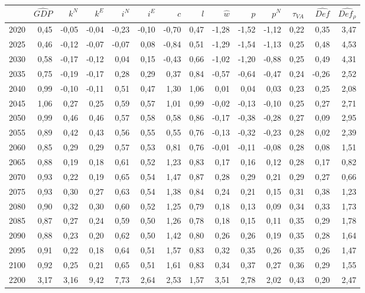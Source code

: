 \begin{tabular}{lrrrrrrrrrrrrr}
\toprule
 & $\hat{GDP}$ & $k^N$ & $k^E$ & $i^N$ & $i^E$ & $c$ & $l$ & $\hat{w}$ & $p$ & $p^N$ & $\tau_{VA}$ & $\hat{Def}$ & $\hat{Def_\rho}$ \\
\midrule
2020 & 0,45 & -0,05 & -0,04 & -0,23 & -0,10 & -0,70 & 0,47 & -1,28 & -1,52 & -1,12 & 0,22 & 0,35 & 3,47 \\
2025 & 0,46 & -0,12 & -0,07 & -0,07 & 0,08 & -0,84 & 0,51 & -1,29 & -1,54 & -1,13 & 0,25 & 0,48 & 4,53 \\
2030 & 0,58 & -0,17 & -0,12 & 0,04 & 0,15 & -0,43 & 0,66 & -1,02 & -1,20 & -0,88 & 0,25 & 0,49 & 4,31 \\
2035 & 0,75 & -0,19 & -0,17 & 0,28 & 0,29 & 0,37 & 0,84 & -0,57 & -0,64 & -0,47 & 0,24 & -0,26 & 2,52 \\
2040 & 0,99 & -0,10 & -0,11 & 0,51 & 0,47 & 1,30 & 1,06 & 0,01 & 0,04 & 0,03 & 0,23 & 0,25 & 2,08 \\
2045 & 1,06 & 0,27 & 0,25 & 0,59 & 0,57 & 1,01 & 0,99 & -0,02 & -0,13 & -0,10 & 0,25 & 0,27 & 2,71 \\
2050 & 0,99 & 0,46 & 0,46 & 0,57 & 0,58 & 0,58 & 0,86 & -0,17 & -0,38 & -0,28 & 0,27 & 0,09 & 2,95 \\
2055 & 0,89 & 0,42 & 0,43 & 0,56 & 0,55 & 0,55 & 0,76 & -0,13 & -0,32 & -0,23 & 0,28 & 0,02 & 2,39 \\
2060 & 0,85 & 0,29 & 0,29 & 0,57 & 0,53 & 0,81 & 0,76 & -0,01 & -0,11 & -0,08 & 0,28 & 0,08 & 1,51 \\
2065 & 0,88 & 0,19 & 0,18 & 0,61 & 0,52 & 1,23 & 0,83 & 0,17 & 0,16 & 0,12 & 0,28 & 0,17 & 0,82 \\
2070 & 0,93 & 0,22 & 0,19 & 0,65 & 0,54 & 1,47 & 0,87 & 0,28 & 0,29 & 0,21 & 0,29 & 0,27 & 0,66 \\
2075 & 0,93 & 0,30 & 0,27 & 0,63 & 0,54 & 1,38 & 0,84 & 0,24 & 0,21 & 0,15 & 0,31 & 0,38 & 1,23 \\
2080 & 0,90 & 0,32 & 0,30 & 0,60 & 0,52 & 1,25 & 0,79 & 0,18 & 0,13 & 0,09 & 0,34 & 0,33 & 1,73 \\
2085 & 0,87 & 0,27 & 0,24 & 0,59 & 0,50 & 1,26 & 0,78 & 0,18 & 0,15 & 0,11 & 0,35 & 0,29 & 1,78 \\
2090 & 0,88 & 0,23 & 0,20 & 0,62 & 0,50 & 1,42 & 0,80 & 0,26 & 0,26 & 0,19 & 0,35 & 0,28 & 1,64 \\
2095 & 0,91 & 0,22 & 0,18 & 0,64 & 0,51 & 1,57 & 0,83 & 0,32 & 0,35 & 0,26 & 0,35 & 0,26 & 1,47 \\
2100 & 0,92 & 0,25 & 0,21 & 0,65 & 0,51 & 1,61 & 0,83 & 0,34 & 0,37 & 0,27 & 0,36 & 0,29 & 1,55 \\
2200 & 3,17 & 3,16 & 9,42 & 7,73 & 2,64 & 2,53 & 1,57 & 3,51 & 2,78 & 2,02 & 0,43 & 0,20 & 2,47 \\
\bottomrule
\end{tabular}
